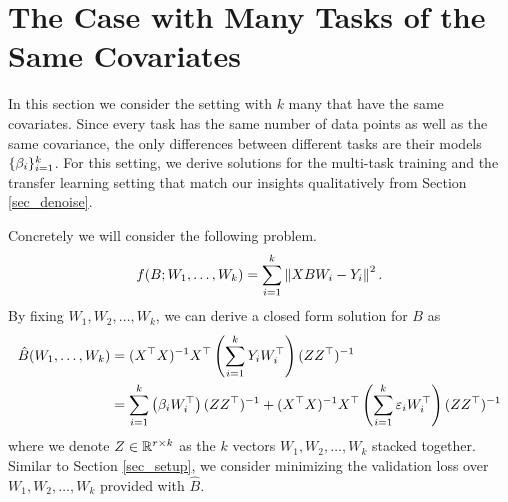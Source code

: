 \section{The Case with Many Tasks of the Same Covariates}

In this section we consider the setting with $k$ many that have the same covariates.
Since every task has the same number of data points as well as the same covariance, the only differences between different tasks are their models $\{\beta_i\}_{i=1}^k$.
For this setting, we derive solutions for the multi-task training and the transfer learning setting that match our insights qualitatively from Section \ref{sec_denoise}.

Concretely we will consider the following problem.
\begin{align}
	f(B; W_1, \dots, W_k) = \sum_{i=1}^k \left\| X B W_i - Y_i \right\|^2. \label{eq_mtl_same_cov}
\end{align}
By fixing $W_1, W_2, \dots, W_k$, we can derive a closed form solution for $B$ as
\begin{align*}
	\hat{B}(W_1, \dots, W_k) &= (X^{\top}X)^{-1} X^{\top} \left({\sum_{i=1}^k Y_i W_i^{\top}}\right) (Z Z^{\top})^{-1} \\
	&= \sum_{i=1}^k \left({\beta_i W_i^{\top}}\right) (ZZ^{\top})^{-1} + (X^{\top}X)^{-1}X^{\top} \left({\sum_{i=1}^k \varepsilon_i W_i^{\top}}\right) (ZZ^{\top})^{-1}
\end{align*}
where we denote $Z\in\mathbb{R}^{r\times k}$ as the $k$ vectors $W_1, W_2, \dots, W_k$ stacked together.
Similar to Section \ref{sec_setup}, we consider minimizing the validation loss over $W_1, W_2, \dots, W_k$ provided with $\hat{B}$.


